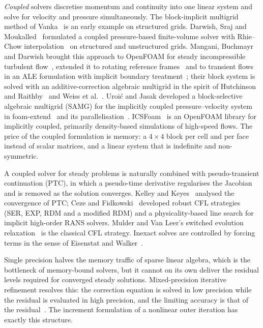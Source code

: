\documentclass[11pt,a4paper]{article}
\begin{document}
\emph{Coupled} solvers discretise momentum and continuity into one linear
system and solve for velocity and pressure simultaneously. The block-implicit
multigrid method of Vanka~\cite{Vanka1986} is an early example on structured
grids. Darwish, Sraj and Moukalled~\cite{Darwish2007,Darwish2009} formulated a
coupled pressure-based finite-volume solver with Rhie--Chow
interpolation~\cite{RhieChow1983} on structured and unstructured grids.
Mangani, Buchmayr and Darwish brought this approach to OpenFOAM for steady
incompressible turbulent flow~\cite{Mangani2014a}, extended it to rotating
reference frames~\cite{Mangani2014b} and to transient flows in an ALE
formulation with implicit boundary treatment~\cite{Mangani2017}; their block
system is solved with an additive-correction algebraic multigrid in the
spirit of Hutchinson and Raithby~\cite{Hutchinson1986} and Weiss et
al.~\cite{Weiss1999}. Uroi\'c and Jasak developed a block-selective algebraic
multigrid (SAMG) for the implicitly coupled pressure--velocity system in
foam-extend~\cite{Uroic2018} and its parallelisation~\cite{Uroic2021}.
ICSFoam~\cite{Oliani2023} is an OpenFOAM library for implicitly coupled,
primarily density-based simulations of high-speed flows. The price of the
coupled formulation is memory: a $4\times4$ block per cell and per face
instead of scalar matrices, and a linear system that is indefinite and
non-symmetric.

A coupled solver for steady problems is naturally combined with
pseudo-transient continuation (PTC), in which a pseudo-time derivative
regularises the Jacobian and is removed as the solution converges. Kelley and
Keyes~\cite{Kelley1998} analysed the convergence of PTC; Ceze and
Fidkowski~\cite{Ceze2011,Ceze2013AIAA,Ceze2015} developed robust CFL
strategies (SER, EXP, RDM and a modified RDM) and a physicality-based line
search for implicit high-order RANS solvers. Mulder and Van Leer's switched
evolution relaxation~\cite{MulderVanLeer1985} is the classical CFL
strategy. Inexact solves are controlled by forcing terms in the sense of
Eisenstat and Walker~\cite{EisenstatWalker1996,Knoll2004}.

Single precision halves the memory traffic of sparse linear algebra, which is
the bottleneck of memory-bound solvers, but it cannot on its own deliver the
residual levels required for converged steady solutions. Mixed-precision
iterative refinement resolves this: the correction equation is solved in low
precision while the residual is evaluated in high precision, and the limiting
accuracy is that of the residual~\cite{Baboulin2009,Carson2018}. The
increment formulation of a nonlinear outer iteration has exactly this
structure.
\end{document}
